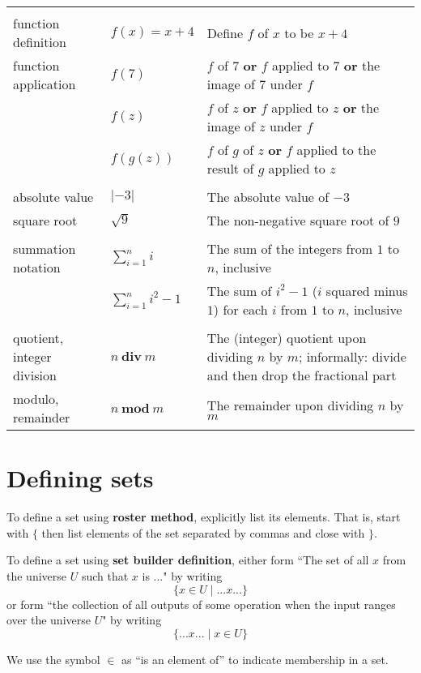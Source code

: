 \documentclass[12pt, oneside]{article}
\begin{document}
\begin{center}
\begin{tabular}{|llp{9cm}|}
&&\\
function definition & $f(x) = x + 4$ & Define $f$ of $x$ to be $x + 4$ \\
function application & $f(7)$ & $f$ of $7$ {\bf or} $f$ applied to $7$ {\bf or} the image of $7$ under $f$\\
                     & $f(z)$ & $f$ of $z$ {\bf or} $f$ applied to $z$ {\bf or} the image of $z$ under $f$\\
                     & $f(g(z))$ & $f$ of $g$ of $z$ {\bf or} $f$ applied to the result of $g$ applied to $z$ \\
&&\\
absolute value & $\lvert -3 \rvert$ & The absolute value of $-3$ \\
square root & $\sqrt{9}$ & The non-negative square root of $9$ \\
&&\\
summation notation & $\displaystyle \sum_{i=1}^n i$ & The sum of the integers from $1$ to $n$, inclusive \\
                    & $\displaystyle \sum_{i=1}^n i^2 - 1$ & The sum of $i^2 - 1$ ($i$ squared minus $1$) for each $i$ from $1$ to $n$, inclusive \\
&&\\
quotient, integer division & $n~\textbf{div}~m$ & The (integer) quotient upon dividing $n$ by $m$; informally: divide and then 
drop the fractional part\\
modulo, remainder & $n~\textbf{mod}~m$ & The remainder upon dividing $n$ by $m$ \\

\hline
\end{tabular}
\end{center} \vfill
\section*{Defining sets}


To define a set using {\bf roster method}, explicitly list its elements. That is,
start with $\{$ then list elements of 
the set separated by commas and close with $\}$.

To define a set using {\bf set builder definition}, either form 
``The set of all $x$ from the universe $U$ such that $x$ is ..." by writing
\[\{x \in U \mid ...x... \}\]
or form ``the collection of all outputs of some operation when the input ranges over the universe $U$"
by writing
\[\{ ...x... \mid x\in U \}\]

We use the symbol $\in$ as ``is an element of'' to indicate membership in a set.
\end{document}
